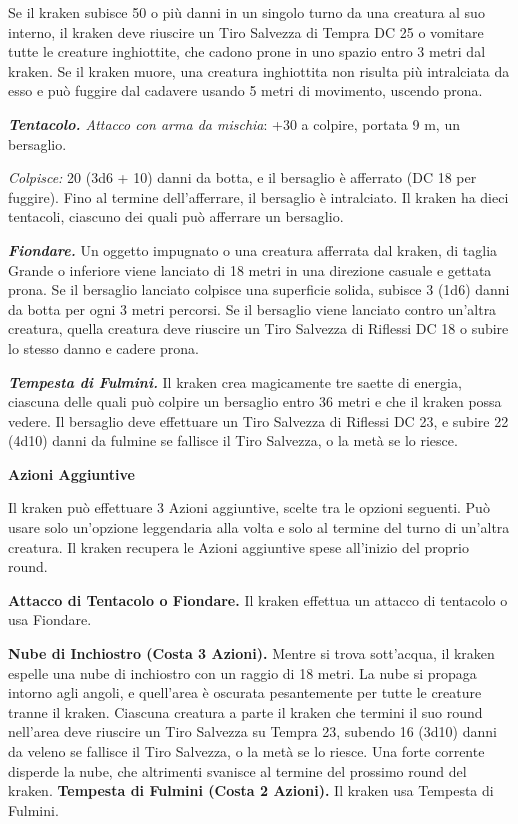 \begin{multicols}{2}
Se il kraken subisce 50 o più danni in un singolo turno da una creatura al suo interno, il kraken deve riuscire un Tiro Salvezza di Tempra DC 25 o vomitare tutte le creature inghiottite, che cadono prone in uno spazio entro 3 metri dal kraken. Se il kraken muore, una creatura inghiottita non risulta più intralciata da esso e può fuggire dal cadavere usando 5 metri di movimento, uscendo prona.

\textit{\textbf{Tentacolo.} Attacco con arma da mischia}: +30 a colpire, portata 9 m, un bersaglio.

\textit{Colpisce:} 20 (3d6 + 10) danni da botta, e il bersaglio è afferrato (DC 18 per fuggire). Fino al termine dell'afferrare, il bersaglio è intralciato. Il kraken ha dieci tentacoli, ciascuno dei quali può afferrare un bersaglio.

\textit{\textbf{Fiondare.}} Un oggetto impugnato o una creatura afferrata dal kraken, di taglia Grande o inferiore viene lanciato di 18 metri in una direzione casuale e gettata prona. Se il bersaglio lanciato colpisce una superficie solida, subisce 3 (1d6) danni da botta per ogni 3 metri percorsi. Se il bersaglio viene lanciato contro un'altra creatura, quella creatura deve riuscire un Tiro Salvezza di Riflessi DC 18 o subire lo stesso danno e cadere prona.

\textit{\textbf{Tempesta di Fulmini.}} Il kraken crea magicamente tre saette di energia, ciascuna delle quali può colpire un bersaglio entro 36 metri e che il kraken possa vedere. Il bersaglio deve effettuare un Tiro Salvezza di Riflessi DC 23, e subire 22 (4d10) danni da fulmine se fallisce il Tiro Salvezza, o la metà se lo riesce.

\textbf{Azioni Aggiuntive}

Il kraken può effettuare 3 Azioni aggiuntive, scelte tra le opzioni seguenti. Può usare solo un'opzione leggendaria alla volta e solo al termine del turno di un'altra creatura. Il kraken recupera le Azioni aggiuntive spese all'inizio del proprio round.

\textbf{Attacco di Tentacolo o Fiondare.} Il kraken effettua un attacco di tentacolo o usa Fiondare.

\textbf{Nube di Inchiostro (Costa 3 Azioni).} Mentre si trova sott'acqua, il kraken espelle una nube di inchiostro con un raggio di 18 metri. La nube si propaga intorno agli angoli, e quell'area è oscurata pesantemente per tutte le creature tranne il kraken. Ciascuna creatura a parte il kraken che termini il suo round nell'area deve riuscire un Tiro Salvezza su Tempra 23, subendo 16 (3d10) danni da veleno se fallisce il Tiro Salvezza, o la metà se lo riesce. Una forte corrente disperde la nube, che altrimenti svanisce al termine del prossimo round del kraken. \textbf{Tempesta di Fulmini (Costa 2 Azioni).} Il kraken usa Tempesta di Fulmini.


\end{multicols}
